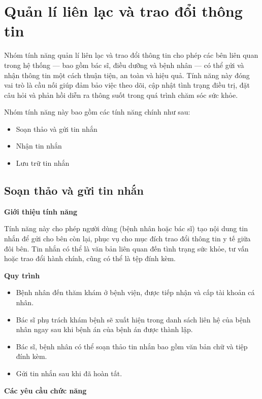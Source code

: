 \section{Quản lí liên lạc và trao đổi thông tin}

Nhóm tính năng quản lí liên lạc và trao đổi thông tin cho phép các bên liên quan trong hệ thống — bao gồm bác sĩ, điều dưỡng và bệnh nhân — có thể gửi và nhận thông tin một cách thuận tiện, an toàn và hiệu quả. Tính năng này đóng vai trò là cầu nối giúp đảm bảo việc theo dõi, cập nhật tình trạng điều trị, đặt câu hỏi và phản hồi diễn ra thông suốt trong quá trình chăm sóc sức khỏe.

Nhóm tính năng này bao gồm các tính năng chính như sau:
\begin{itemize}
  \item Soạn thảo và gửi tin nhắn
  \item Nhận tin nhắn
  \item Lưu trữ tin nhắn
\end{itemize}

\subsection{Soạn thảo và gửi tin nhắn}

\noindent \textbf{Giới thiệu tính năng}

Tính năng này cho phép người dùng (bệnh nhân hoặc bác sĩ) tạo nội dung tin nhắn để gửi cho bên còn lại, phục vụ cho mục đích trao đổi thông tin y tế giữa đôi bên. Tin nhắn có thể là văn bản liên quan đến tình trạng sức khỏe, tư vấn hoặc trao đổi hành chính, cũng có thể là tệp đính kèm.

\noindent \textbf{Quy trình}

\begin{itemize}

  \item Bệnh nhân đến thăm khám ở bệnh viện, được tiếp nhận và cấp tài khoản cá nhân.
  \item Bác sĩ phụ trách khám bệnh sẽ xuất hiện trong danh sách liên hệ của bệnh nhân ngay sau khi bệnh án của bệnh án được thành lập.
  \item Bác sĩ, bệnh nhân có thể soạn thảo tin nhắn bao gồm văn bản chữ và tiệp đính kèm.
  \item Gửi tin nhắn sau khi đã hoàn tất.

\end{itemize}

\vspace{1em} \noindent \textbf{Các yêu cầu chức năng}

